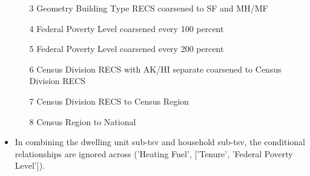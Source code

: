 \begin{itemize}
\begin{itemize}
  \item [3] Geometry Building Type RECS coarsened to SF and MH/MF
  \item [4] Federal Poverty Level coarsened every 100 percent
  \item [5] Federal Poverty Level coarsened every 200 percent
  \item [6] Census Division RECS with AK/HI separate coarsened to Census Division RECS
  \item [7] Census Division RECS to Census Region
  \item [8] Census Region to National
  \end{itemize}
\item In combining the dwelling unit sub-tsv and household sub-tsv, the conditional relationships are ignored across ('Heating Fuel', ['Tenure', 'Federal Poverty Level']).
\end{itemize}
